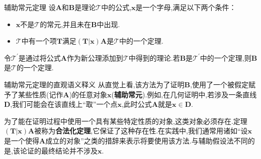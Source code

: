 \begin{metatheorem}{辅助常元定理}{}
	设$\boldsymbol{A}$和$\boldsymbol{B}$是理论$\mathcal{T}$中的公式,$\boldsymbol{x}$是一个字母,满足以下两个条件：
	\begin{itemize}
		\item $\boldsymbol{x}$不是$\mathcal{T}$的常元,并且未在$\boldsymbol{B}$中出现.
		\item $\mathcal{T}$中有一个项$\boldsymbol{T}$满足$\left(\boldsymbol{T}|\boldsymbol{x}\right)\boldsymbol{A}$是$\mathcal{T}$中的一个定理.
	\end{itemize}
	令$\mathcal{T}^{\prime}$是通过将公式$\boldsymbol{A}$作为新公理添加到$\mathcal{T}$中得到的理论.若$\boldsymbol{B}$是$\mathcal{T}^{\prime}$中的一个定理,则$\boldsymbol{B}$是$\mathcal{T}$的一个定理.
\end{metatheorem}

\begin{remark}{辅助常元定理的直观语义释义}{}
	从直觉上看,该方法为了证明$\boldsymbol{B}$,使用了一个被假定赋予了某些性质(记作$\boldsymbol{A}$)的任意对象$\boldsymbol{x}$(\textbf{辅助常元}).例如,在几何证明中,若涉及一条直线 $\boldsymbol{D}$,我们可能会在该直线上``取''一个点$\boldsymbol{x}$,此时公式$\boldsymbol{A}$就是$\boldsymbol{x}\in\boldsymbol{D}$.
	
	为了能在证明过程中使用一个具有某些特定性质的对象,这类对象必须存在.定理$\left(\boldsymbol{T}|\boldsymbol{x}\right)\boldsymbol{A}$被称为\textbf{合法化定理},它保证了这种存在性.在实践中,我们通常用诸如``设$\boldsymbol{x}$是一个使得$\boldsymbol{A}$成立的对象''之类的措辞来表示将要使用该方法.与辅助假设法不同的是,该论证的最终结论并不涉及$\boldsymbol{x}$.
\end{remark}


